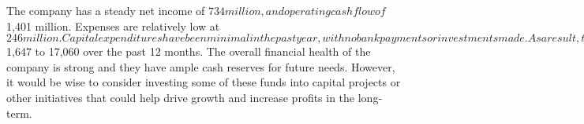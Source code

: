 

The company has a steady net income of $734 million, and operating cash flow of $1,401 million. Expenses are relatively low at $246 million. Capital expenditures have been minimal in the past year, with no bank payments or investments made. As a result, their cash balance has grown steadily from $1,647 to 17,060 over the past 12 months. The overall financial health of the company is strong and they have ample cash reserves for future needs. However, it would be wise to consider investing some of these funds into capital projects or other initiatives that could help drive growth and increase profits in the long-term.